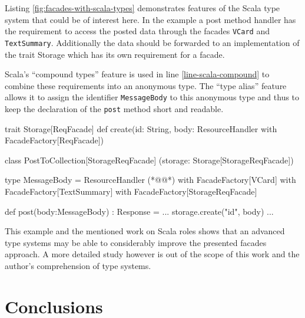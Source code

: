 \documentclass[12pt,a4paper,twoside]{scrartcl}		%
\begin{document}
Listing \ref{fig:facades-with-scala-types} demonstrates features of the Scala
type system\cite{Odersky2011} that could be of interest here. In the example a
post method handler has the requirement to access the posted data through the
facades \lstinline:VCard: and \lstinline:TextSummary:. Additionally the data
should be forwarded to an implementation of the trait Storage which has its own
requirement for a facade.

Scala's ``compound types'' feature is used in line \ref{line-scala-compound} to
combine these requirements into an anonymous type. The ``type alias'' feature
allows it to assign the identifier \lstinline:MessageBody: to this anonymous
type and thus to keep the declaration of the \lstinline:post: method short and
readable.

\begin{javalisting}[label=fig:facades-with-scala-types,
                   numbers=left,
                   escapeinside={(*@}{@*)},
                   caption={Implementing the facades approach with Scala's type system}]
trait Storage[ReqFacade] {
 def create(id: String,
            body: ResourceHandler
                  with FacadeFactory[ReqFacade])
}

class PostToCollection[StorageReqFacade]
            (storage: Storage[StorageReqFacade]) {
 type MessageBody = ResourceHandler (*@\label{line-scala-compound}@*)
                    with FacadeFactory[VCard] 
                    with FacadeFactory[TextSummary]
                    with FacadeFactory[StorageReqFacade]
  
 def post(body:MessageBody) : Response = {
  ...
  storage.create("id", body)
  ...
 }
}
\end{javalisting}

This example and the mentioned work on Scala roles shows that an advanced type
systems may be able to considerably improve the presented facades approach. A
more detailed study however is out of the scope of this work and the author's
comprehension of type systems.


\section{Conclusions}
\label{sec:conclusions}

\end{document}
